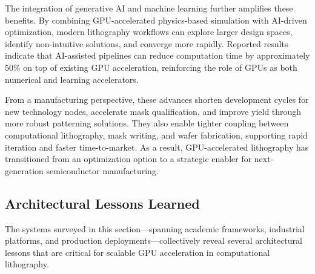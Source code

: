 \documentclass[pdflatex,sn-mathphys-num]{sn-jnl}%
\theoremstyle{thmstyleone}%
\theoremstyle{thmstyletwo}%
\theoremstyle{thmstylethree}%
\begin{document}
The integration of generative AI and machine learning further amplifies these benefits. By combining GPU-accelerated physics-based simulation with AI-driven optimization, modern lithography workflows can explore larger design spaces, identify non-intuitive solutions, and converge more rapidly. Reported results indicate that AI-assisted pipelines can reduce computation time by approximately 50\% on top of existing GPU acceleration, reinforcing the role of GPUs as both numerical and learning accelerators.

From a manufacturing perspective, these advances shorten development cycles for new technology nodes, accelerate mask qualification, and improve yield through more robust patterning solutions. They also enable tighter coupling between computational lithography, mask writing, and wafer fabrication, supporting rapid iteration and faster time-to-market. As a result, GPU-accelerated lithography has transitioned from an optimization option to a strategic enabler for next-generation semiconductor manufacturing.

\subsection{Architectural Lessons Learned} 
The systems surveyed in this section—spanning academic frameworks, industrial platforms, and production deployments—collectively reveal several architectural lessons that are critical for scalable GPU acceleration in computational lithography.
\end{document}
